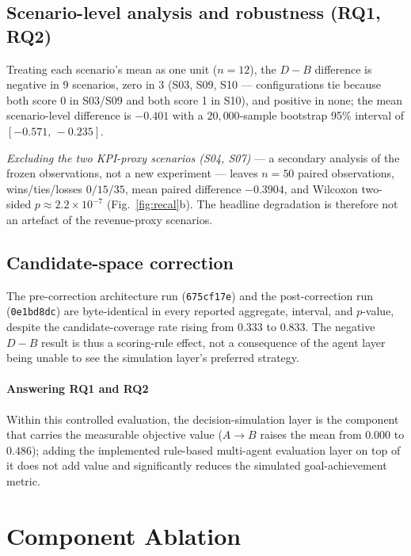 \documentclass[conference]{IEEEtran}
\newcommand{\expid}[1]{\texttt{#1}}
\begin{document}
\subsection{Scenario-level analysis and robustness (RQ1, RQ2)}
\label{sec:robustness}
Treating each scenario's mean as one unit ($n = 12$), the $D - B$ difference is
negative in 9 scenarios, zero in 3 (S03, S09, S10 --- configurations tie because
both score 0 in S03/S09 and both score 1 in S10), and positive in none; the mean
scenario-level difference is $-0.401$ with a $20{,}000$-sample bootstrap 95\%
interval of $[-0.571,\,-0.235]$.

\emph{Excluding the two KPI-proxy scenarios (S04, S07)} --- a secondary analysis
of the frozen observations, not a new experiment --- leaves $n = 50$ paired
observations, wins/ties/losses $0/15/35$, mean paired difference $-0.3904$, and
Wilcoxon two-sided $p \approx 2.2\times10^{-7}$ (Fig.~\ref{fig:recal}b). The
headline degradation is therefore not an artefact of the revenue-proxy
scenarios.

\subsection{Candidate-space correction}
\label{sec:candspace}
The pre-correction architecture run (\expid{675cf17e}) and the post-correction
run (\expid{0e1bd8dc}) are byte-identical in every reported aggregate, interval,
and $p$-value, despite the candidate-coverage rate rising from $0.333$ to
$0.833$. The negative $D - B$ result is thus a scoring-rule effect, not a
consequence of the agent layer being unable to see the simulation layer's
preferred strategy.

\paragraph{Answering RQ1 and RQ2}
Within this controlled evaluation, the decision-simulation layer is the
component that carries the measurable objective value ($A \rightarrow B$ raises
the mean from $0.000$ to $0.486$); adding the implemented rule-based multi-agent
evaluation layer on top of it does not add value and significantly reduces the
simulated goal-achievement metric.

\section{Component Ablation}
\label{sec:ablation}
\end{document}
